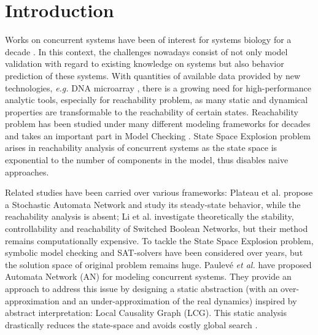 \documentclass[runningheads]{llncs}
\begin{document}
\section{Introduction}
\label{intro}
Works on concurrent systems have been of interest for systems biology for a decade \cite{bockmayr2002using,bortolussi2008modeling,wiley2003computational}. 
In this context, the challenges nowadays consist of not only model validation with regard to existing knowledge on systems but also behavior prediction of these systems. 
With quantities of available data provided by new technologies, \textit{e.g.} DNA microarray \cite{marx2013}, there is a growing need for high-performance analytic tools, especially for reachability problem, as many static and dynamical properties are transformable to the reachability of certain states.
Reachability problem has been studied under many different modeling frameworks for decades \cite{akutsu2007control,barrett2006complexity,Daws1998,esparza1998,mayr1984,wozna2003} and takes an important part in Model Checking \cite{clarke20142}. 
State Space Explosion problem arises in reachability analysis of concurrent systems as the state space is exponential to the number of components in the model, thus disables naive approaches. 

Related studies have been carried over various frameworks: Plateau et al. \cite{plateau1991stochastic} propose a Stochastic Automata Network and study its steady-state behavior, while the reachability analysis is absent; Li et al. \cite{li2012reachability,li2014stability} investigate theoretically the stability, controllability and reachability of Switched Boolean Networks, but their method remains computationally expensive.  
To tackle the State Space Explosion problem, symbolic model checking \cite{burch1992symbolic} and SAT-solvers \cite{abdulla2000symbolic} have been considered over years, but the solution space of original problem remains huge.
Paulev\'e \textit{et al.} \cite{folschette2015,pauleve2011} have proposed Automata Network (AN) for modeling concurrent systems. 
They provide an approach to address this issue by designing a static abstraction (with an over-approximation and an under-approximation of the real dynamics) inspired by abstract interpretation: Local Causality Graph (LCG). 
This static analysis drastically reduces the state-space and avoids costly global search \cite{pauleve2012}.
\end{document}
